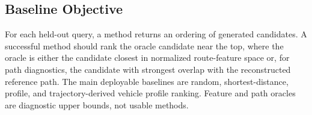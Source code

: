 \subsection{Baseline Objective}
For each held-out query, a method returns an ordering of generated candidates. A successful method should rank the oracle candidate near the top, where the oracle is either the candidate closest in normalized route-feature space or, for path diagnostics, the candidate with strongest overlap with the reconstructed reference path. The main deployable baselines are random, shortest-distance, profile, and trajectory-derived vehicle profile ranking. Feature and path oracles are diagnostic upper bounds, not usable methods.
